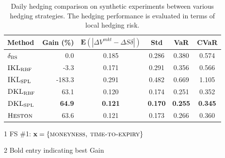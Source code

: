 \documentclass[letterpaper,12pt,titlepage,oneside,final]{book}
\numberwithin{equation}{section}
\theoremstyle{definition}
\newcommand{\vx}{\mathbf{x}}
\newcommand{\E}{\mathbf{E}}
\newcommand{\DS}{\Delta S}
\newcommand{\Heston}{\textsc{Heston}}
\newcommand{\DVmkt}{\Delta V^{mkt}}
\newcommand{\MeanAbs}{\E(|\DVmkt-\DS \delta |)}
\newcommand{\DKLs}{\bf\textsc{DKL}_{\text{SPL}}}
\newcommand{\DKLg}{\bf\textsc{DKL}_{\text{RBF}}}
\newcommand{\IKLs}{\bf\textsc{IKL}_{\text{SPL}}}
\newcommand{\IKLg}{\bf\textsc{IKL}_{\text{RBF}}}
\newcommand{\Del}{\delta_{\textsc{BS}}}
\begin{document}
 \begin{table}[htp!]
\begin{center}
\begin{threeparttable}
\begin{tabular}{|l|r c c c c|}
\hline
Method & Gain (\%)& $\MeanAbs$ & Std& VaR & CVaR   \\ \hline
$\Del$ & 0.0 & 0.185 & 0.286 & 0.380 & 0.574 \\
$\IKLg$  & -3.3 & 0.171 & 0.291 & 0.356 & 0.566 \\
$\IKLs$  & -183.3 & 0.291 & 0.482 & 0.669 & 1.105 \\
$\DKLg$  & 63.1 & 0.120 & 0.174 & 0.251 & 0.352 \\
$\DKLs$  & \textbf{64.9} & \textbf{0.121} & \textbf{0.170} & \textbf{0.255} & \textbf{0.345} \\
$\Heston$ & 63.6 & 0.121 & 0.173 & 0.266 & 0.360 \\
\hline
\end{tabular}
\caption{Daily hedging comparison on synthetic experiments between various hedging strategies. The hedging performance is evaluated in terms of local hedging risk.}
\label{Daily}
 \begin{tablenotes}
    \small
  \item[1] FS \#1: $\vx=\{\textsc{moneyness,~time-to-expiry}\}$
  \item[2] Bold entry indicating best Gain
  \end{tablenotes}
  \end{threeparttable}
\end{center}
\end{table}
\end{document}
